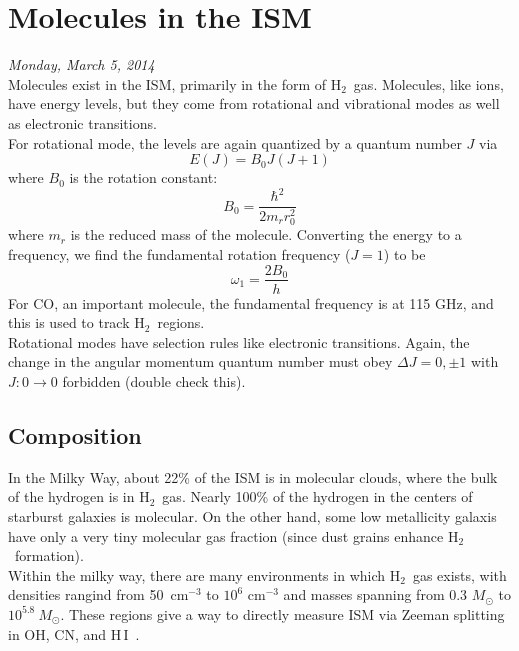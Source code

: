 \documentclass[10pt]{article}
\numberwithin{equation}{section}
\newcommand{\n}{\noindent}
\newcommand{\HI}{H\,I\ }
\newcommand{\Htwo}{H$_2$\ }
\begin{document}
\section{Molecules in the ISM} %
\label{sec:molecules_in_the_ism}
\textit{Monday, March 5, 2014}\\

  \n Molecules exist in the ISM, primarily in the form of \Htwo gas. Molecules,
  like ions, have energy levels, but they come from rotational and vibrational
  modes as well as electronic transitions.\\
  
  \n For rotational mode, the levels are again quantized by a quantum number
  $J$ via
  \begin{equation}
    \label{eq:mols:1} E(J) = B_0J(J+1)
  \end{equation}
  where $B_0$ is the rotation constant:
  \begin{equation}
    \label{eq:mols:2} B_0 = \frac{\hbar^2}{2m_r r_0^2}
  \end{equation}
  where $m_r$ is the reduced mass of the molecule. Converting the energy to a
  frequency, we find the fundamental rotation frequency ($J=1$) to be
  \begin{equation}
    \label{eq:mols:3} \omega_1 = \frac{2B_0}{h}
  \end{equation}
  For CO, an important molecule, the fundamental frequency is at 115 GHz, and
  this is used to track \Htwo regions.\\
  
  \n Rotational modes have selection rules like electronic transitions. Again,
  the change in the angular momentum quantum number must obey $\Delta J = 0,
  \pm 1$ with $J:0\to0$ forbidden (double check this).
  \subsection{Composition} %
  \label{sub:composition}
  In the Milky Way, about 22\% of the ISM is in molecular clouds, where the
  bulk of the hydrogen is in \Htwo gas. Nearly 100\% of the hydrogen in the
  centers of starburst galaxies is molecular. On the other hand, some low
  metallicity galaxis have only a very tiny molecular gas fraction (since dust
  grains enhance \Htwo formation).\\
  
  \n Within the milky way, there are many environments in which \Htwo gas
  exists, with densities rangind from 50\ cm$^{-3}$ to $10^6$ cm$^{-3}$ and
  masses spanning from 0.3 $M_\odot$ to $10^{5.8}\ M_\odot$. These regions give
  a way to directly measure ISM via Zeeman splitting in OH, CN, and \HI.\\
  
\end{document}
